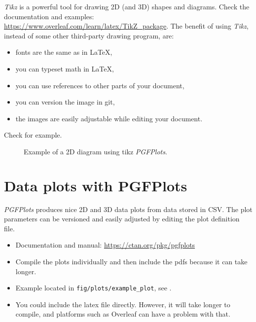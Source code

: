 \emph{Tikz} is a powerful tool for drawing 2D (and 3D) shapes and diagrams.
Check the documentation and examples: \url{https://www.overleaf.com/learn/latex/TikZ_package}.
The benefit of using \emph{Tikz}, instead of some other third-party drawing program, are:
\begin{itemize}
  \item fonts are the same as in LaTeX,
  \item you can typeset math in LaTeX,
  \item you can use references to other parts of your document,
  \item you can version the image in git,
  \item the images are easily adjustable while editing your document.
\end{itemize}
Check  for example.

\begin{figure}[htbp]
  \centering

  \begin{adjustbox}{max totalsize={0.6\textwidth}{0.90\textheight}, center}
    
  \end{adjustbox}

  \caption{Example of a 2D diagram using tikz \emph{PGFPlots}.}
  \label{fig:pgfplots_diagram}
\end{figure}

\section{Data plots with PGFPlots}

\emph{PGFPlots} produces nice 2D and 3D data plots from data stored in CSV.
The plot parameters can be versioned and easily adjusted by editing the plot definition file.
\begin{itemize}
  \item Documentation and manual: \url{https://ctan.org/pkg/pgfplots}
  \item Compile the plots individually and then include the pdfs because it can take longer.
  \item Example located in \texttt{fig/plots/example\_plot}, see .
  \item You could include the latex file directly. However, it will take longer to compile, and platforms such as Overleaf can have a problem with that.
\end{itemize}

